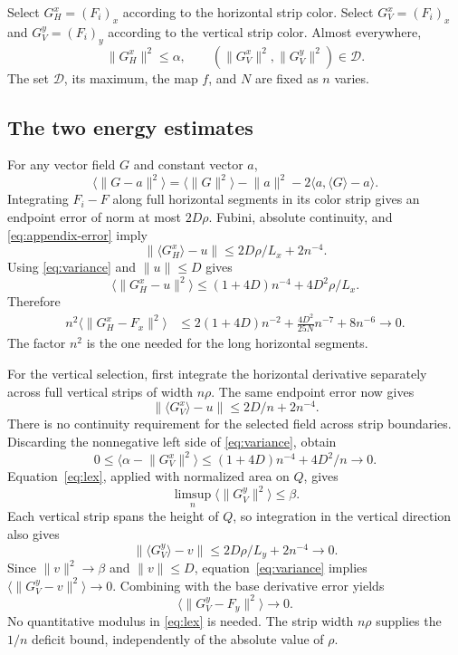 \documentclass[11pt]{article}
\theoremstyle{remark}
\newcommand{\norm}[1]{\lVert#1\rVert}
\newcommand{\ip}[2]{\langle#1,#2\rangle}
\newcommand{\av}[1]{\langle#1\rangle}
\begin{document}
Select $G_H^x=(F_i)_x$ according to the horizontal strip color. Select $G_V^x=(F_i)_x$ and $G_V^y=(F_i)_y$ according to the vertical strip color. Almost everywhere,
\[
 \norm{G_H^x}^2\le\alpha,\qquad
 (\norm{G_V^x}^2,\norm{G_V^y}^2)\in\mathcal D.
\]
The set $\mathcal D$, its maximum, the map $f$, and $N$ are fixed as $n$ varies.

\subsection{The two energy estimates}
For any vector field $G$ and constant vector $a$,
\begin{equation}\label{eq:variance}
 \av{\norm{G-a}^2}
 =\av{\norm G^2}-\norm a^2-2\ip{a}{\av G-a}.
\end{equation}
Integrating $F_i-F$ along full horizontal segments in its color strip gives an endpoint error of norm at most $2D\rho$. Fubini, absolute continuity, and \eqref{eq:appendix-error} imply
\[
 \norm{\av{G_H^x}-u}\le2D\rho/L_x+2n^{-4}.
\]
Using \eqref{eq:variance} and $\norm u\le D$ gives
\[
 \av{\norm{G_H^x-u}^2}\le(1+4D)n^{-4}+4D^2\rho/L_x.
\]
Therefore
\begin{equation}\label{eq:horiz-rate}
 \begin{split}
 n^2\av{\norm{G_H^x-F_x}^2}
 &\le2(1+4D)n^{-2}
       +\frac{4D^2}{25N}n^{-7}+8n^{-6}\longrightarrow0.
 \end{split}
\end{equation}
The factor $n^2$ is the one needed for the long horizontal segments.

For the vertical selection, first integrate the horizontal derivative separately across full vertical strips of width $n\rho$. The same endpoint error now gives
\[
 \norm{\av{G_V^x}-u}\le2D/n+2n^{-4}.
\]
There is no continuity requirement for the selected field across strip boundaries. Discarding the nonnegative left side of \eqref{eq:variance}, obtain
\[
 0\le\av{\alpha-\norm{G_V^x}^2}
 \le(1+4D)n^{-4}+4D^2/n\longrightarrow0.
\]
Equation~\eqref{eq:lex}, applied with normalized area on $Q$, gives
\[
 \limsup_n\av{\norm{G_V^y}^2}\le\beta.
\]
Each vertical strip spans the height of $Q$, so integration in the vertical direction also gives
\[
 \norm{\av{G_V^y}-v}\le2D\rho/L_y+2n^{-4}\longrightarrow0.
\]
Since $\norm v^2\to\beta$ and $\norm v\le D$, equation~\eqref{eq:variance} implies $\av{\norm{G_V^y-v}^2}\to0$. Combining with the base derivative error yields
\begin{equation}\label{eq:vert-rate}
 \av{\norm{G_V^y-F_y}^2}\longrightarrow0.
\end{equation}
No quantitative modulus in \eqref{eq:lex} is needed. The strip width $n\rho$ supplies the $1/n$ deficit bound, independently of the absolute value of $\rho$.
\end{document}
